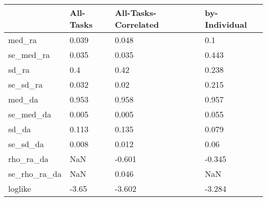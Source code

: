 \begin{tabular}{llll}
& All-Tasks & All-Tasks-Correlated & by-Individual \\ 
\hline 
med_ra & 0.039 & 0.048 & 0.1 \\ 
se_med_ra & 0.035 & 0.035 & 0.443 \\ 
sd_ra & 0.4 & 0.42 & 0.238 \\ 
se_sd_ra & 0.032 & 0.02 & 0.215 \\ 
med_da & 0.953 & 0.958 & 0.957 \\ 
se_med_da & 0.005 & 0.005 & 0.055 \\ 
sd_da & 0.113 & 0.135 & 0.079 \\ 
se_sd_da & 0.008 & 0.012 & 0.06 \\ 
rho_ra_da & NaN & -0.601 & -0.345 \\ 
se_rho_ra_da & NaN & 0.046 & NaN \\ 
loglike & -3.65 & -3.602 & -3.284 \\ 
\hline 
\end{tabular}